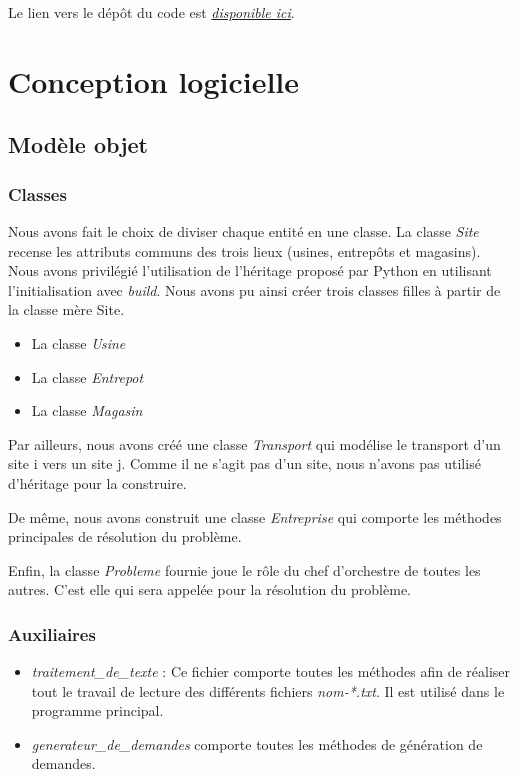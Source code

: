 \documentclass[12pt, a4paper]{article}
\begin{document}
\noindent Le lien vers le dépôt du code est \emph{\href{https://github.com/mistertot/SupplyChainProject}{disponible ici}}.

\newpage


\section{Conception logicielle}
\subsection{Modèle objet}

\subsubsection{Classes}
Nous avons fait le choix de diviser chaque entité en une classe. La classe \emph{Site} recense les attributs communs des trois lieux (usines, entrepôts et magasins). Nous avons privilégié l'utilisation de l'héritage proposé par Python en utilisant l'initialisation avec \emph{build}. Nous avons pu ainsi créer trois classes filles à partir de la classe mère Site.
\begin{itemize}
\item La classe \emph{Usine}
\item La classe \emph{Entrepot}
\item La classe \emph{Magasin}
\end{itemize}

Par ailleurs, nous avons créé une classe \emph{Transport} qui modélise le transport d'un site i vers un site j. Comme il ne s'agit pas d'un site, nous n'avons pas utilisé d'héritage pour la construire.

De même, nous avons construit une classe \emph{Entreprise} qui comporte les méthodes principales de résolution du problème.

Enfin, la classe \emph{Probleme} fournie joue le rôle du chef d'orchestre de toutes les autres. C'est elle qui sera appelée pour la résolution du problème.

\subsubsection{Auxiliaires}
\begin{itemize}
\item \emph{traitement\_de\_texte} : Ce fichier comporte toutes les méthodes afin de réaliser tout le travail de lecture des différents fichiers \emph{nom-*.txt}. Il est utilisé dans le programme principal.
\item \emph{generateur\_de\_demandes} comporte toutes les méthodes de génération de demandes.
\end{itemize}
\end{document}
